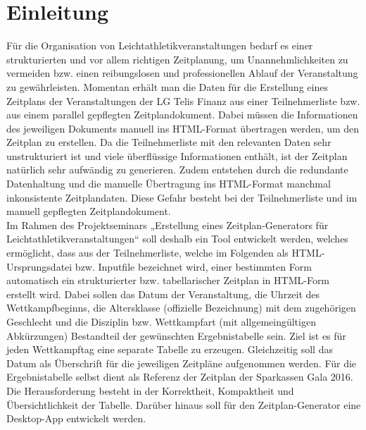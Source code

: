 
\chapter{Einleitung}
\label{chap:Einleitung}

Für die Organisation von Leichtathletikveranstaltungen bedarf es einer strukturierten und vor allem richtigen Zeitplanung, um Unannehmlichkeiten zu vermeiden bzw. einen reibungslosen und professionellen Ablauf der Veranstaltung zu gewährleisten. Momentan erhält man die Daten für die Erstellung eines Zeitplans der Veranstaltungen der LG Telis Finanz aus einer Teilnehmerliste bzw. aus einem parallel gepflegten Zeitplandokument. Dabei müssen die Informationen des jeweiligen Dokuments manuell ins \ac{HTML}-Format übertragen werden, um den Zeitplan zu erstellen. Da die Teilnehmerliste mit den relevanten Daten sehr unstrukturiert ist und viele überflüssige Informationen enthält, ist der Zeitplan natürlich sehr aufwändig zu generieren. Zudem entstehen durch die redundante Datenhaltung und die manuelle Übertragung ins HTML-Format manchmal inkonsistente Zeitplandaten. Diese Gefahr besteht bei der Teilnehmerliste und im manuell gepflegten Zeitplandokument. \\
Im Rahmen des Projektseminars „Erstellung eines Zeitplan-Generators für Leichtathletikveranstaltungen“ soll deshalb ein Tool entwickelt werden, welches ermöglicht, dass aus der Teilnehmerliste, welche im Folgenden als \ac{HTML}-Ursprungsdatei bzw. Inputfile bezeichnet wird, einer bestimmten Form automatisch ein strukturierter bzw. tabellarischer Zeitplan in HTML-Form erstellt wird. Dabei sollen das Datum der Veranstaltung, die Uhrzeit des Wettkampfbeginns, die Altersklasse (offizielle Bezeichnung) mit dem zugehörigen Geschlecht und die Disziplin bzw. Wettkampfart (mit allgemeingültigen Abkürzungen) Bestandteil der gewünschten Ergebnistabelle sein. Ziel ist es für jeden Wettkampftag eine separate Tabelle zu erzeugen. Gleichzeitig soll das Datum als Überschrift für die jeweiligen Zeitpläne aufgenommen werden. Für die Ergebnistabelle selbst dient als Referenz der Zeitplan der Sparkassen Gala 2016.
Die Herausforderung besteht in der Korrektheit, Kompaktheit und Übersichtlichkeit der Tabelle. 
Darüber hinaus soll für den Zeitplan-Generator eine Desktop-App entwickelt werden.\\
